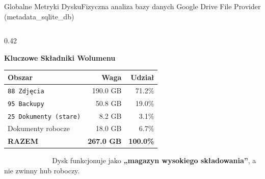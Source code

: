 \documentclass[aspectratio=169, 10pt]{beamer}
\newcommand{\badge}[2]{{\setlength{\fboxsep}{2pt}\colorbox{#1}{\textcolor{white}{\sffamily\bfseries\tiny #2}}}}
\newcommand{\alertTag}[1]{{\badge{brandRed}{#1}}}
\begin{document}
\begin{frame}{Globalne Metryki Dysku}{Fizyczna analiza bazy danych Google Drive File Provider (metadata\_sqlite\_db)}
\begin{columns}[T]
    \begin{column}{0.42\textwidth}
      \begin{block}{\textbf{Kluczowe Składniki Wolumenu}}
        \small
        \begin{tabular}{lrr}
          \toprule
          \textbf{Obszar} & \textbf{Waga} & \textbf{Udział} \\
          \midrule
          \texttt{88 Zdjęcia} & 190.0 GB & 71.2\% \\
          \texttt{95 Backupy} & 50.8 GB & 19.0\% \\
          \texttt{25 Dokumenty (stare)} & 8.2 GB & 3.1\% \\
          Dokumenty robocze & 18.0 GB & 6.7\% \\
          \midrule
          \textbf{RAZEM} & \textbf{267.0 GB} & \textbf{100.0\%} \\
          \bottomrule
        \end{tabular}
      \end{block}
      
      \vspace{0.1cm}
      \footnotesize \alertTag{DIAGNOZA} Dysk funkcjonuje jako \textbf{„magazyn wysokiego składowania”}, a nie zwinny hub roboczy.
    \end{column}
  \end{columns}
\end{frame}
\end{document}
